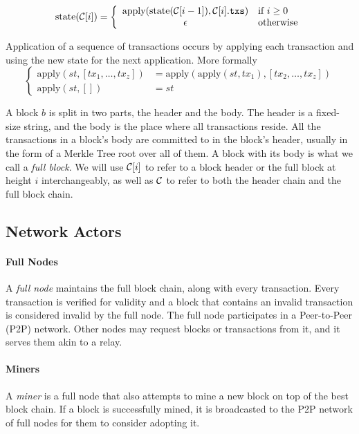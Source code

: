\[
\text{state}(\mathcal{C}[i]) = \left\{
    \begin{array}{cl}
        \text{apply}(\text{state}(\mathcal{C}[i-1]), \mathcal{C}[i].\texttt{txs}) & \text{if } i \ge 0 \\
        \epsilon & \text{otherwise}
    \end{array}
\right.
\]

Application of a sequence of transactions occurs by applying each transaction and using the new state for the next application. More formally
\[
\left\{
    \begin{array}{rl}
        \text{apply}(st, [tx_1, \dots, tx_z]) &= \text{apply}(\text{apply}(st, tx_1), [tx_2, \dots, tx_z]) \\
        \text{apply}(st, []) &= st
    \end{array}
\right.
\]

A block $b$ is split in two parts, the header and the body. The header is a fixed-size string, and the body is the place where all transactions reside. All the transactions in a block's body are committed to in the block's header, usually in the form of a Merkle Tree root over all of them. A block with its body is what we call a \emph{full block}. We will use $\mathcal{C}[i]$ to refer to a block header or the full block at height $i$ interchangeably, as well as $\mathcal{C}$ to refer to both the header chain and the full block chain.

\subsection{Network Actors}
\paragraph{Full Nodes}
A \emph{full node} maintains the full block chain, along with every transaction. Every transaction is verified for validity and a block that contains an invalid transaction is considered invalid by the full node. The full node participates in a Peer-to-Peer (P2P) network. Other nodes may request blocks or transactions from it, and it serves them akin to a relay.
\paragraph{Miners}
A \emph{miner} is a full node that also attempts to mine a new block on top of the best block chain. If a block is successfully mined, it is broadcasted to the P2P network of full nodes for them to consider adopting it.


